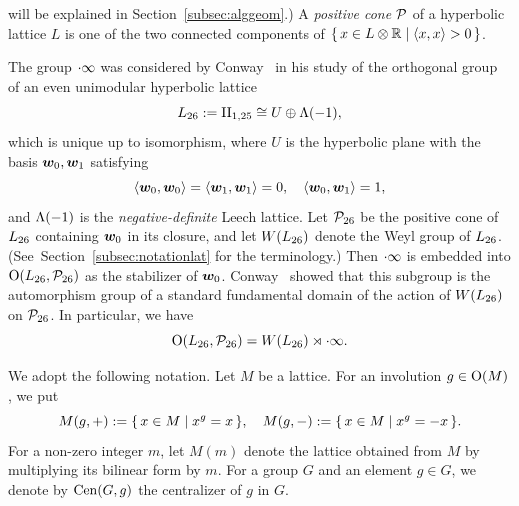 \documentclass{amsart} %
\begin{document}
will be explained in Section~\ref{subsec:alggeom}.)
A \emph{positive cone} $\mathord{\mathcal{P}}$ of a hyperbolic lattice $L$
is one of the two connected components 
of $\{\,{x\in L\otimes \mathord{\mathbb{R}}}\mid {\langle x, x \rangle>0} \,\}$.
\par
The group $\cdot \infty$ was considered by Conway~\cite{MR690711}
 in his study of the orthogonal group of an even unimodular hyperbolic lattice
 \[
 L_{26}:=\mathrm{II}_{1,25} \cong U\oplus \Lambda(-1), 
\]
which is unique up to isomorphism,
where $U$ is the hyperbolic plane with the basis $\boldsymbol{w}_0, \boldsymbol{w}_1$
satisfying 
%
\begin{equation}\label{eq:w0w1}
\langle \boldsymbol{w}_0, \boldsymbol{w}_0 \rangle=\langle \boldsymbol{w}_1, \boldsymbol{w}_1 \rangle=0, 
\quad \langle \boldsymbol{w}_0, \boldsymbol{w}_1 \rangle=1, 
\end{equation}
%
and $\Lambda(-1)$ is the \emph{negative-definite} Leech lattice.
Let $\mathord{\mathcal{P}}_{26}$ be 
the positive cone of $L_{26}$ containing $\boldsymbol{w}_0$ in its closure, 
and 
let $W(L_{26})$ denote the Weyl group of $L_{26}$.
(See~Section~\ref{subsec:notationlat} for the terminology.)
Then $\cdot \infty$ is embedded into $\mathord{\mathrm{O}}(L_{26}, \mathord{\mathcal{P}}_{26})$
as the stabilizer of $\boldsymbol{w}_0$.
Conway~\cite{MR690711} showed that 
 this subgroup is
the automorphism group
of a standard fundamental domain of the action of $W(L_{26})$ on $\mathord{\mathcal{P}}_{26}$.
In particular, we have 
\[
\mathord{\mathrm{O}}(L_{26}, \mathord{\mathcal{P}}_{26})= W(L_{26}) \rtimes\cdot \infty.
\]
\par
%
We adopt the following notation.
Let $M$ be a lattice.
For an involution $g\in \mathord{\mathrm{O}}(M)$, we put
%
\begin{equation}\label{eq:Mgpm}
M(g, +):=\{\,{x\in M}\mid {x^g=x} \,\},
\quad
M(g, -):=\{\,{x\in M}\mid {x^g=-x} \,\}.
\end{equation}
%
For  a non-zero integer $m$,
let $M(m)$ denote the lattice obtained from $M$ by multiplying its bilinear form by
$m$.
For a group $G$ and an element $g\in G$,
we denote by $\mathrm{Cen}(G, g)$ the centralizer of $g$ in $G$.
%
%
\end{document}
